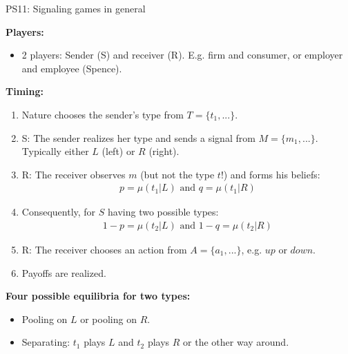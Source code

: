 \begin{frame}{PS11: Signaling games in general}
    \begin{multicols}{2}
      \textbf{Players:}\vspace{-10pt}
      \begin{itemize}
        \item 2 players: Sender (S) and receiver (R). E.g. firm and consumer, or employer and employee (Spence).
      \end{itemize}\vspace{-8pt}
      \textbf{Timing:}\vspace{-10pt}
      \begin{enumerate}
        \item Nature chooses the sender's type from $T=\{t_1,...\}$.
        \item \vspace{-4pt} S: The sender realizes her type and sends a signal from $M=\{m_1,...\}$. Typically either $L$ (left) or $R$ (right).
        \item \vspace{-4pt} R: The receiver observes $m$ (but not the type $t$!) and forms his beliefs:\vspace{-8pt}
        \begin{align*}
          p=\mu(t_1|L)\text{ and }q=\mu(t_1|R)
        \end{align*}
        \item[] \vspace{-8pt} Consequently, for $S$ having two possible types:\vspace{-8pt}
        \begin{align*}
          1-p=\mu(t_2|L)\text{ and }1-q=\mu(t_2|R)
        \end{align*}
        \item \vspace{-8pt} R: The receiver chooses an action from $A=\{a_1,...\}$, e.g. $up$ or $down$.
        \item \vspace{-4pt} Payoffs are realized.
      \end{enumerate}\vspace{-8pt}
      \textbf{Four possible equilibria for two types:}\vspace{-8pt}
      \begin{itemize}
        \item Pooling on $L$ or pooling on $R$.
        \item \vspace{-4pt} Separating: $t_1$ plays $L$ and $t_2$ plays $R$ or the other way around.

\end{itemize}
\end{multicols}
\end{frame}
